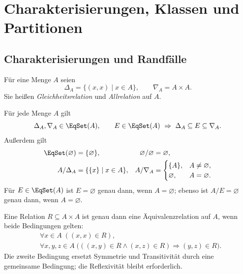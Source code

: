 \chapter{Charakterisierungen, Klassen und Partitionen}
\label{b11guide:ch:classes}

\section{Charakterisierungen und Randfälle}

\begin{definition}
Für eine Menge $A$ seien
\[
 \Delta_A=\{(x,x)\mid x\in A\},\qquad \nabla_A=A\times A.
\]
Sie heißen \emph{Gleichheitsrelation} und \emph{Allrelation} auf $A$.
\end{definition}

\begin{theorem}
\label{b11guide:thm:extremes}
Für jede Menge $A$ gilt
\[
 \Delta_A,\nabla_A\in\EqSet(A),\qquad
 E\in\EqSet(A)\ \Rightarrow\ \Delta_A\subseteq E\subseteq\nabla_A.
\]
Außerdem gilt
\[
\begin{aligned}
 \EqSet(\varnothing)&=\{\varnothing\},&
 \varnothing/\varnothing&=\varnothing,\\
 A/\Delta_A&=\{\{x\}\mid x\in A\},&
 A/\nabla_A&=
 \begin{cases}\{A\},&A\ne\varnothing,\\
                \varnothing,&A=\varnothing.
 \end{cases}
\end{aligned}
\]
Für $E\in\EqSet(A)$ ist $E=\varnothing$ genau dann, wenn
$A=\varnothing$; ebenso ist $A/E=\varnothing$ genau dann,
wenn $A=\varnothing$.
\end{theorem}

\begin{theorem}
\label{b11guide:thm:euclidean}
Eine Relation $R\subseteq A\times A$ ist genau dann eine
Äquivalenzrelation auf $A$, wenn beide Bedingungen gelten:
\[
\begin{aligned}
 &\forall x\in A\;((x,x)\in R),\\
 &\forall x,y,z\in A\;
   \bigl(((x,y)\in R\land(x,z)\in R)\Rightarrow(y,z)\in R\bigr).
\end{aligned}
\]
Die zweite Bedingung ersetzt Symmetrie und Transitivität durch
eine gemeinsame Bedingung; die Reflexivität bleibt erforderlich.
\end{theorem}

